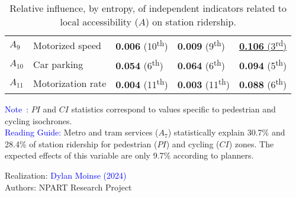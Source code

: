 \begin{table}[h!]
{\begin{tabular}{p{}p{}p{}p{}p{}}
\small{\(A_{9}\)} & \small{Motorized speed} & \small{\textbf{0.006} (10\textsuperscript{th})} & \small{\textbf{0.009} (9\textsuperscript{th})} & \underline{\small{\textbf{0.106}} (3\textsuperscript{rd})}\\
\small{\(A_{10}\)} & \small{Car parking} & \small{\textbf{0.054} (6\textsuperscript{th})} & \small{\textbf{0.064} (6\textsuperscript{th})} & \small{\textbf{0.094} (5\textsuperscript{th})}\\
\small{\(A_{11}\)} & \small{Motorization rate} & \small{\textbf{0.004} (11\textsuperscript{th})} & \small{\textbf{0.003} (11\textsuperscript{th})} & \small{\textbf{0.088} (6\textsuperscript{th})}\\
        \hline
        \end{tabular}}
    \caption{Relative influence, by entropy, of independent indicators related to local accessibility (\(A\)) on station ridership.}
    \label{table-chap6:influence-indicateurs-accessibility}
        \vspace{5pt}
        \begin{flushleft}\scriptsize{
        \textcolor{blue}{Note~:} \(PI\) and \(CI\) statistics correspond to values specific to pedestrian and cycling isochrones.
        \\
        \textcolor{blue}{Reading Guide:} Metro and tram services (\(A_{7}\)) statistically explain 30.7\% and 28.4\% of station ridership for pedestrian (\(PI\)) and cycling (\(CI\)) zones. The expected effects of this variable are only 9.7\% according to planners.
        }\end{flushleft}
        \begin{flushright}\scriptsize{
        Realization: \textcolor{blue}{Dylan Moinse (2024)}
        \\
        Authors: \acrshort{NPART} Research Project
        }\end{flushright}
        \end{table}